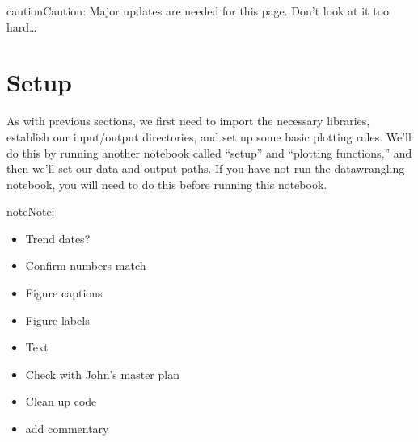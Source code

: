\documentclass[letterpaper,10pt,english]{jupyterBook}
\begin{document}
\begin{sphinxadmonition}{caution}{Caution:}
\sphinxAtStartPar
Major updates are needed for this page. Don’t look at it too hard…
\end{sphinxadmonition}


\chapter{Setup}
\label{\detokenize{notebooks/regional_and_local/SL_anomaly_annual:setup}}
\sphinxAtStartPar
As with previous sections, we first need to import the necessary libraries, establish our input/output directories, and set up some basic plotting rules. We’ll do this by running another notebook called “setup” and “plotting functions,” and then we’ll set our data and output paths. If you have not run the datawrangling notebook, you will need to do this before running this notebook.

\begin{sphinxShadowBox}
\sphinxstylesidebartitle{}

\begin{sphinxadmonition}{note}{Note:}
\sphinxAtStartPar
{}
\begin{itemize}
\item {} 
\sphinxAtStartPar
Trend dates?

\item {} 
\sphinxAtStartPar
Confirm numbers match

\item {} 
\sphinxAtStartPar
Figure captions

\item {} 
\sphinxAtStartPar
Figure labels

\item {} 
\sphinxAtStartPar
Text

\item {} 
\sphinxAtStartPar
Check with John’s master plan

\item {} 
\sphinxAtStartPar
Clean up code

\item {} 
\sphinxAtStartPar
add commentary

\end{itemize}
\end{sphinxadmonition}
\end{sphinxShadowBox}

\begin{sphinxVerbatim}[commandchars=\\\{\}]

\end{sphinxVerbatim}
\end{document}
